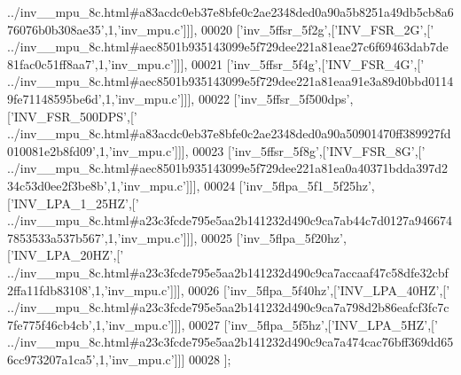 \begin{DoxyCode}
{      ../inv\_\_mpu\_8c.html#a83acdc0eb37e8bfe0c2ae2348ded0a90a5b8251a49db5cb8a676076b0b308ae35'},1,\textcolor{stringliteral}{'inv\_mpu.c'}]]],
00020   [\textcolor{stringliteral}{'inv\_5ffsr\_5f2g'},[\textcolor{stringliteral}{'INV\_FSR\_2G'},[\textcolor{stringliteral}{'
      ../inv\_\_mpu\_8c.html#aec8501b935143099e5f729dee221a81eae27c6f69463dab7de81fac0c51ff8aa7'},1,\textcolor{stringliteral}{'inv\_mpu.c'}]]],
00021   [\textcolor{stringliteral}{'inv\_5ffsr\_5f4g'},[\textcolor{stringliteral}{'INV\_FSR\_4G'},[\textcolor{stringliteral}{'
      ../inv\_\_mpu\_8c.html#aec8501b935143099e5f729dee221a81eaa91e3a89d0bbd01149fe71148595be6d'},1,\textcolor{stringliteral}{'inv\_mpu.c'}]]],
00022   [\textcolor{stringliteral}{'inv\_5ffsr\_5f500dps'},[\textcolor{stringliteral}{'INV\_FSR\_500DPS'},[\textcolor{stringliteral}{'
      ../inv\_\_mpu\_8c.html#a83acdc0eb37e8bfe0c2ae2348ded0a90a50901470ff389927fd010081e2b8fd09'},1,\textcolor{stringliteral}{'inv\_mpu.c'}]]],
00023   [\textcolor{stringliteral}{'inv\_5ffsr\_5f8g'},[\textcolor{stringliteral}{'INV\_FSR\_8G'},[\textcolor{stringliteral}{'
      ../inv\_\_mpu\_8c.html#aec8501b935143099e5f729dee221a81ea0a40371bdda397d234c53d0ee2f3be8b'},1,\textcolor{stringliteral}{'inv\_mpu.c'}]]],
00024   [\textcolor{stringliteral}{'inv\_5flpa\_5f1\_5f25hz'},[\textcolor{stringliteral}{'INV\_LPA\_1\_25HZ'},[\textcolor{stringliteral}{'
      ../inv\_\_mpu\_8c.html#a23c3fcde795e5aa2b141232d490c9ca7ab44c7d0127a9466747853533a537b567'},1,\textcolor{stringliteral}{'inv\_mpu.c'}]]],
00025   [\textcolor{stringliteral}{'inv\_5flpa\_5f20hz'},[\textcolor{stringliteral}{'INV\_LPA\_20HZ'},[\textcolor{stringliteral}{'
      ../inv\_\_mpu\_8c.html#a23c3fcde795e5aa2b141232d490c9ca7accaaf47c58dfe32cbf2ffa11fdb83108'},1,\textcolor{stringliteral}{'inv\_mpu.c'}]]],
00026   [\textcolor{stringliteral}{'inv\_5flpa\_5f40hz'},[\textcolor{stringliteral}{'INV\_LPA\_40HZ'},[\textcolor{stringliteral}{'
      ../inv\_\_mpu\_8c.html#a23c3fcde795e5aa2b141232d490c9ca7a798d2b86eafcf3fc7c7fe775f46cb4cb'},1,\textcolor{stringliteral}{'inv\_mpu.c'}]]],
00027   [\textcolor{stringliteral}{'inv\_5flpa\_5f5hz'},[\textcolor{stringliteral}{'INV\_LPA\_5HZ'},[\textcolor{stringliteral}{'
      ../inv\_\_mpu\_8c.html#a23c3fcde795e5aa2b141232d490c9ca7a474cac76bff369dd656cc973207a1ca5'},1,\textcolor{stringliteral}{'inv\_mpu.c'}]]]
00028 ];
\end{DoxyCode}
